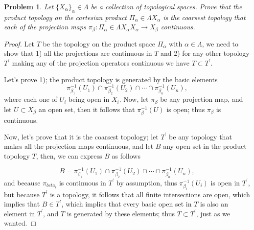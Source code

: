 \documentclass[11pt]{article}
\newtheorem{problem}{Problem}
\newtheorem{proof}{Proof}
\begin{document}
\pagebreak
\begin{problem}
Let $\{X_\alpha\}_\alpha\in\Lambda$ be a collection of topological spaces. Prove that the product topology on the cartesian product $\Pi_\alpha\in \Lambda X_\alpha$ is the coarsest topology that each of the projection maps $\pi_\beta: \Pi_\alpha\in \Lambda X_\alpha X_\alpha\rightarrow X_{\beta}$ continuous. 
\end{problem}
\begin{proof}
Let $T$ be the topology on the product space $\Pi_\alpha$ with $\alpha\in\Lambda$, we need to show that 1) all the projections are continuous in $T$ and 2) for any other topology $T^{\prime}$ making any of the projection operators continuous we have $T\subset T^{\prime}$.

Let's prove 1); the product topology is generated by the basic elements
\begin{displaymath}
  \pi_{\beta_1}^{-1}(U_1)\cap\pi_{\beta_2}^{-1}(U_2)\cap\cdots\cap \pi_{\beta_n}^{-1}(U_n),
\end{displaymath}
where each one of $U_i$ being open in $X_i$. Now, let $\pi_{\beta}$ be any projection map, and let $U\subset X_{\beta}$ an open set, then it follows that $\pi_{\beta}^{-1}(U)$ is open; thus $\pi_{\beta}$ is continuous.

Now, let's prove that it is the coarsest topology; let $T^{\prime}$ be any topology that makes all the projection maps continuous, and let $B$ any open set in the product topology $T$, then, we can express $B$ as follows

\begin{displaymath}
  B=\pi_{\beta_1}^{-1}(U_1)\cap\pi_{\beta_2}^{-1}(U_2)\cap\cdots\cap \pi_{\beta_n}^{-1}(U_n),
\end{displaymath}
and because $\pi_{beta_i}$ is continuous in $T^{\prime}$ by assumption, thus $\pi_{\beta_i}^{-1}(U_i)$ is open in $T^{\prime}$, but because $T^{\prime}$ is a topology, it follows that all finite intersections are open, which implies that $B\in T^{\prime}$, which implies that every basic open set in $T$ is also an element in $T^{\prime}$, and $T$ is generated by these elements; thus $T\subset T^{\prime}$, just as we wanted.



\end{proof}
\end{document}
